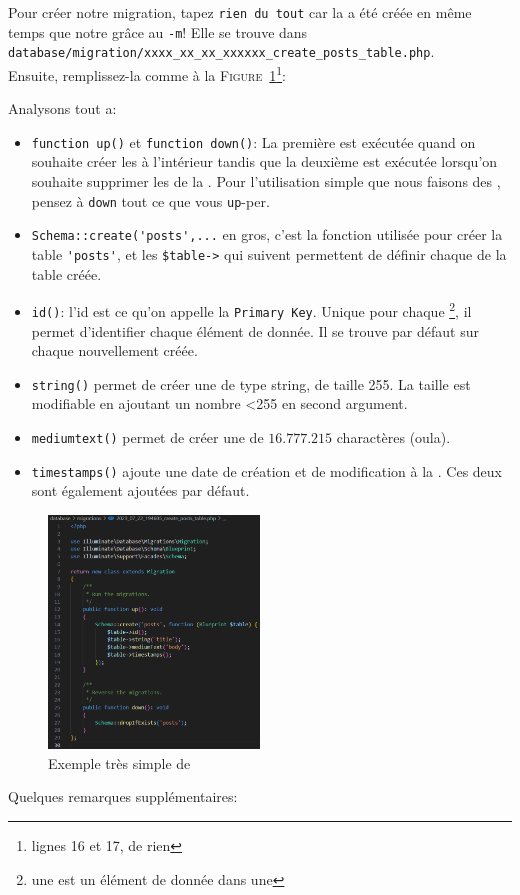 Pour créer notre migration, tapez \verb|rien du tout| car la \migration{} a été créée en même temps que notre \model{} grâce au \verb|-m|! Elle se trouve dans \\\verb|database/migration/xxxx_xx_xx_xxxxxx_create_posts_table.php|. \\Ensuite, remplissez-la comme à la \textsc{Figure~\ref{fig:basic_migration}}\footnote{lignes 16 et 17, de rien}:

Analysons tout a:
\begin{itemize}
    \item \verb|function up()| et \verb|function down()|: La première est exécutée quand on souhaite créer les \tables{} à l'intérieur tandis que la deuxième est exécutée lorsqu'on souhaite supprimer les \tables{} de la \db{}. Pour l'utilisation simple que nous faisons des \migrations{}, pensez à \verb|down| tout ce que vous \verb|up|-per.
    \item \verb|Schema::create('posts',...| en gros, c'est la fonction utilisée pour créer la table \verb|'posts'|, et les \verb|$table->| qui suivent permettent de définir chaque \column{} de la table créée.
    \item \verb|id()|: l'id est ce qu'on appelle la \texttt{Primary Key}. Unique pour chaque \row{}\footnote{une \row{} est un élément de donnée dans une \table{}}, il permet d'identifier chaque élément de donnée. Il se trouve par défaut sur chaque \table{} nouvellement créée.
    \item \verb|string()| permet de créer une \column{} de type string, de taille 255. La taille est modifiable en ajoutant un nombre <255 en second argument.
    \item \verb|mediumtext()| permet de créer une \column{} de $16.777.215$ charactères (oula).
    \item \verb|timestamps()| ajoute une date de création et de modification à la \table{}. Ces deux \columns{} sont également ajoutées par défaut.
\end{itemize}

\begin{figure}
    \vspace{-0.5cm}
    \includegraphics[width=0.5\textwidth]{figures-C1/post_migration.pdf}
    \caption{Exemple très simple de \migration{}\label{fig:basic_migration}}
\end{figure}
Quelques remarques supplémentaires:

